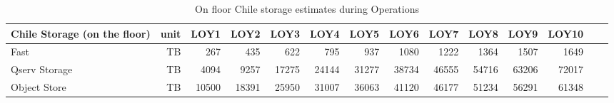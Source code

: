 \tiny \begin{longtable} { |p{}  |r  |r  |r  |r  |r  |r  |r  |r  |r  |r  |r  |r  |r |} 
\caption{On floor Chile storage estimates during Operations
 \label{tab:chileStorageOps}}\\ 
\hline 
\textbf{Chile Storage (on the floor)}&\textbf{unit}&\textbf{LOY1}&\textbf{LOY2}&\textbf{LOY3}&\textbf{LOY4}&\textbf{LOY5}&\textbf{LOY6}&\textbf{LOY7}&\textbf{LOY8}&\textbf{LOY9}&\textbf{LOY10}& \\ \hline
{Fast}&{TB}&{267}&{435}&{622}&{795}&{937}&{1080}&{1222}&{1364}&{1507}&{1649}& \\ \hline
{Qserv Storage}&{TB}&{4094}&{9257}&{17275}&{24144}&{31277}&{38734}&{46555}&{54716}&{63206}&{72017}& \\ \hline
{Object Store}&{TB}&{10500}&{18391}&{25950}&{31007}&{36063}&{41120}&{46177}&{51234}&{56291}&{61348}& \\ \hline
\end{longtable} \normalsize
